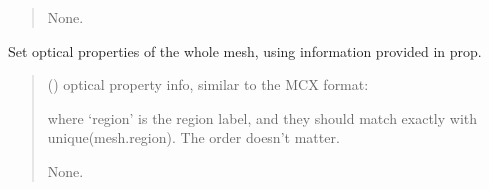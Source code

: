 \documentclass[letterpaper,10pt,english]{sphinxmanual}
\begin{document}
\begin{fulllineitems}
\begin{fulllineitems}
\begin{quote}
\begin{description}
\sphinxAtStartPar
None.

\end{description}\end{quote}

\end{fulllineitems}


\begin{fulllineitems}
\label{\detokenize{_autosummary/nirfasterff.base.dcs_mesh.dcsmesh:nirfasterff.base.dcs_mesh.dcsmesh.set_prop}}
\pysigstartsignatures
{}
\pysigstopsignatures
\sphinxAtStartPar
Set optical properties of the whole mesh, using information provided in prop.
\begin{quote}\begin{description}
\sphinxAtStartPar
{} () \textendash{} 
\sphinxAtStartPar
optical property info, similar to the MCX format:

\begin{sphinxVerbatim}[commandchars=\\\{\}]
\PYG{p}{[}     \PYG{p}{]}
\PYG{p}{[}     \PYG{p}{]}
\PYG{p}{[}\PYG{p}{]}
\end{sphinxVerbatim}

\sphinxAtStartPar
where ‘region’ is the region label, and they should match exactly with unique(mesh.region). The order doesn’t matter.


\sphinxAtStartPar
None.

\end{description}\end{quote}

\end{fulllineitems}


\end{fulllineitems}
\end{document}
